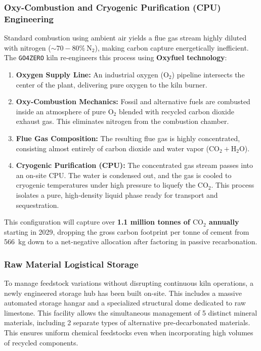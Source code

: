 \subsubsection{Oxy-Combustion and Cryogenic Purification (CPU) Engineering}
Standard combustion using ambient air yields a flue gas stream highly diluted with nitrogen ($\sim 70-80\%\ \text{N}_2$), making carbon capture energetically inefficient. The \MakeLowercase{\texttt{GO4ZERO}} kiln re-engineers this process using \textbf{Oxyfuel technology}:
\begin{enumerate}
    \item \textbf{Oxygen Supply Line:} An industrial oxygen ($\text{O}_2$) pipeline intersects the center of the plant, delivering pure oxygen to the kiln burner.
    \item \textbf{Oxy-Combustion Mechanics:} Fossil and alternative fuels are combusted inside an atmosphere of pure $\text{O}_2$ blended with recycled carbon dioxide exhaust gas. This eliminates nitrogen from the combustion chamber.
    \item \textbf{Flue Gas Composition:} The resulting flue gas is highly concentrated, consisting almost entirely of carbon dioxide and water vapor ($\text{CO}_2 + \text{H}_2\text{O}$).
    \item \textbf{Cryogenic Purification (CPU):} The concentrated gas stream passes into an on-site CPU. The water is condensed out, and the gas is cooled to cryogenic temperatures under high pressure to liquefy the $\text{CO}_2$. This process isolates a pure, high-density liquid phase ready for transport and sequestration.
\end{enumerate}
This configuration will capture over \textbf{\num{1.1} million tonnes of $\text{CO}_2$ annually} starting in 2029, dropping the gross carbon footprint per tonne of cement from \num{566}~\si{\kilogram} down to a net-negative allocation after factoring in passive recarbonation.

\subsubsection{Raw Material Logistical Storage}
To manage feedstock variations without disrupting continuous kiln operations, a newly engineered storage hub has been built on-site. This includes a massive automated storage hangar and a specialized structural dome dedicated to raw limestone. This facility allows the simultaneous management of 5 distinct mineral materials, including 2 separate types of alternative pre-decarbonated materials. This ensures uniform chemical feedstocks even when incorporating high volumes of recycled components.

